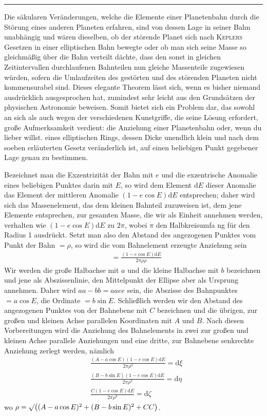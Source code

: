\begin{center}\rule{2cm}{0.3pt}\end{center}
Die säkularen Veränderungen, welche die Elemente einer Planetenbahn durch die Störung eines anderen Planeten erfahren, sind von dessen Lage in seiner Bahn unabhängig und wären dieselben, ob der störende Planet sich nach \textsc{Keplers} Gesetzen in einer elliptischen Bahn bewegte oder ob man sich seine Masse so gleichmäßig über die Bahn verteilt dächte, dass den sonst in gleichen Zeitintervallen durchlaufenen Bahnteilen nun gleiche Massenteile zugewiesen würden, sofern die Umlaufzeiten des gestörten und des störenden Planeten nicht kommensurabel sind. Dieses elegante Theorem lässt sich, wenn es bisher niemand ausdrücklich ausgesprochen hat, zumindest sehr leicht aus den Grundsätzen der physischen Astronomie beweisen. Somit bietet sich ein Problem dar, das sowohl an sich als auch wegen der verschiedenen Kunstgriffe, die seine Lösung erfordert, große Aufmerksamkeit verdient: die Anziehung einer Planetenbahn oder, wenn du lieber willst. eines elliptischen Rings, dessen Dicke unendlich klein und nach dem soeben erläuterten Gesetz veränderlich ist, auf einen beliebigen Punkt gegebener Lage genau zu bestimmen.

Bezeichnet man die Exzentrizität der Bahn mit $e$ und die exzentrische Anomalie eines beliebigen Punktes darin mit $E$, so wird dem Element $\mathrm{d}E$ dieser Anomalie das Element der mittleren Anomalie $(1-e\cos E)\mathrm{d}E$ entsprechen; daher wird sich das Massenelement, das dem kleinen Bahnteil zuzuweisen ist, dem jene Elemente entsprechen, zur gesamten Masse, die wir als Einheit annehmen werden, verhalten wie $(1-e\cos E)\mathrm{d}E$ zu $2\pi$, wobei $\pi$ den Halbkreisumfa%
ng für den Radius 1 ausdrückt. Setzt man also den Abstand des angezogenen Punktes vom Punkt der Bahn $=\rho$, so wird die vom Bahnelement erzeugte Anziehung sein
\[
\begin{aligned}
&=\frac{(1-e\cos E)\mathrm{d}E}{2\pi\rho\rho}
\end{aligned}
\]
Wir werden die große Halbachse mit $a$ und die kleine Halbachse mit $b$ bezeichnen und jene als Abszissenlinie, den Mittelpunkt der Ellipse aber als Ursprung annehmen. Daher wird $aa-bb=aaee$ sein, die Abszisse des Bahnpunktes $=a\cos E$, die Ordinate $=b\sin E$. Schließlich werden wir den Abstand des angezogenen Punktes von der Bahnebene mit $C$ bezeichnen und die übrigen, zur großen und kleinen Achse parallelen Koordinaten mit $A$ und $B$. Nach diesen Vorbereitungen wird die Anziehung des Bahnelements in zwei zur großen und kleinen Achse parallele Anziehungen und eine dritte, zur Bahnebene senkrechte Anziehung zerlegt werden, nämlich
\[
\begin{aligned}
&\frac{(A-a\cos E)(1-e\cos E)\mathrm{d}E}{2\pi\rho^3}=\mathrm{d}\xi\\[6pt]
&\frac{(B-b\sin E)(1-e\cos E)\mathrm{d}E}{2\pi\rho^3}=\mathrm{d}\eta\\[6pt]
&\frac{C(1-e\cos E)\mathrm{d}E}{2\pi\rho^3}=\mathrm{d}\zeta
\end{aligned}
\]
wo $\rho=\surd\bigl((A-a\cos E)^2+(B-b\sin E)^2+CC\bigr)$.

